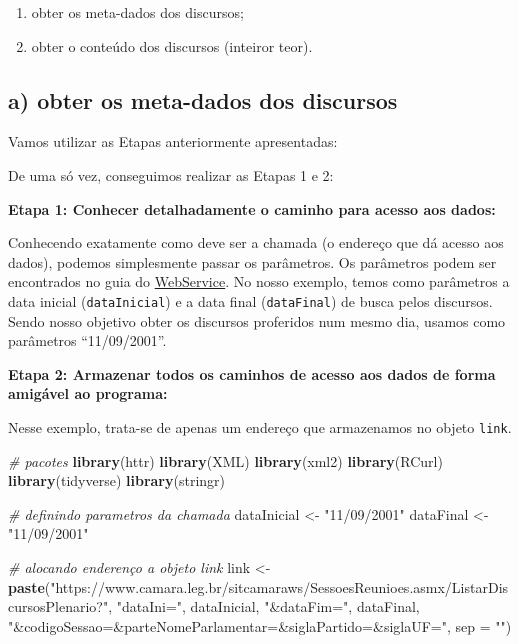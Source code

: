 \documentclass[]{book}
\newenvironment{Shaded}{\begin{snugshade}}{\end{snugshade}}
\newcommand{\CommentTok}[1]{\textcolor[rgb]{0.56,0.35,0.01}{\textit{#1}}}
\newcommand{\DataTypeTok}[1]{\textcolor[rgb]{0.13,0.29,0.53}{#1}}
\newcommand{\KeywordTok}[1]{\textcolor[rgb]{0.13,0.29,0.53}{\textbf{#1}}}
\newcommand{\NormalTok}[1]{#1}
\newcommand{\StringTok}[1]{\textcolor[rgb]{0.31,0.60,0.02}{#1}}
\providecommand{\tightlist}{%
  \setlength{\itemsep}{0pt}\setlength{\parskip}{0pt}}
\begin{document}
\begin{enumerate}
\def\labelenumi{\alph{enumi})}
\tightlist
\item
  obter os meta-dados dos discursos;
\item
  obter o conteúdo dos discursos (inteiror teor).
\end{enumerate}

\hypertarget{a-obter-os-meta-dados-dos-discursos}{%
\subsection{a) obter os meta-dados dos discursos}\label{a-obter-os-meta-dados-dos-discursos}}

Vamos utilizar as Etapas anteriormente apresentadas:

De uma só vez, conseguimos realizar as Etapas 1 e 2:

\textbf{Etapa 1: Conhecer detalhadamente o caminho para acesso aos dados:}

Conhecendo exatamente como deve ser a chamada (o endereço que dá acesso aos dados),
podemos simplesmente passar os parâmetros. Os parâmetros podem ser encontrados no guia do \href{https://www2.camara.leg.br/transparencia/dados-abertos/dados-abertos-legislativo/webservices/sessoesreunioes-2/listardiscursosplenario}{WebService}.
No nosso exemplo, temos como parâmetros a data inicial (\texttt{dataInicial}) e a data
final (\texttt{dataFinal}) de busca pelos discursos. Sendo nosso objetivo obter os
discursos proferidos num mesmo dia, usamos como parâmetros ``11/09/2001''.

\textbf{Etapa 2: Armazenar todos os caminhos de acesso aos dados de forma amigável ao programa:}

Nesse exemplo, trata-se de apenas um endereço que armazenamos no objeto \texttt{link}.

\begin{Shaded}
\begin{Highlighting}[]
\CommentTok{# pacotes }
\KeywordTok{library}\NormalTok{(httr)}
\KeywordTok{library}\NormalTok{(XML)}
\KeywordTok{library}\NormalTok{(xml2)}
\KeywordTok{library}\NormalTok{(RCurl)}
\KeywordTok{library}\NormalTok{(tidyverse)}
\KeywordTok{library}\NormalTok{(stringr)}

\CommentTok{# definindo parametros da chamada}
\NormalTok{dataInicial <-}\StringTok{ "11/09/2001"} 
\NormalTok{dataFinal <-}\StringTok{ "11/09/2001"}

\CommentTok{# alocando enderenço a objeto link}
\NormalTok{link <-}\StringTok{ }\KeywordTok{paste}\NormalTok{(}\StringTok{"https://www.camara.leg.br/sitcamaraws/SessoesReunioes.asmx/ListarDiscursosPlenario?"}\NormalTok{,}
                \StringTok{"dataIni="}\NormalTok{, dataInicial,}
                \StringTok{"&dataFim="}\NormalTok{, dataFinal, }
                \StringTok{"&codigoSessao=&parteNomeParlamentar=&siglaPartido=&siglaUF="}\NormalTok{,}
                \DataTypeTok{sep =} \StringTok{""}\NormalTok{)}
\end{Highlighting}
\end{Shaded}
\end{document}
